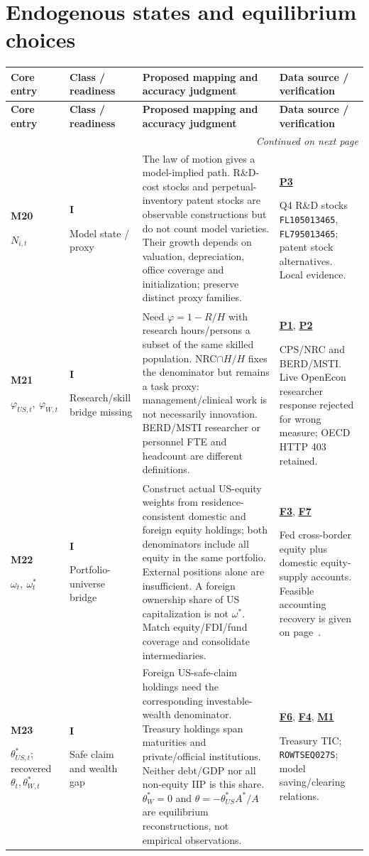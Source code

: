 \documentclass[10pt,a4paper,landscape]{article}
\makeatletter
\newcommand{\code}[1]{{\footnotesize\texttt{#1}}}
\newenvironment{measuretable}{%
\fontsize{9.4}{10.8}\selectfont\setlength{\parskip}{1pt}
\begin{longtable}{@{}P{\dimexpr .14\textwidth-4.2pt\relax}P{\dimexpr .135\textwidth-4.05pt\relax}P{\dimexpr .455\textwidth-13.65pt\relax}P{\dimexpr .27\textwidth-8.1pt\relax}@{}}
\toprule\rowcolor{tablehead}\textbf{Core entry} & \textbf{Class / readiness} & \textbf{Proposed mapping and accuracy judgment} & \textbf{Data source / verification}\\\midrule
\endfirsthead
\toprule\rowcolor{tablehead}\textbf{Core entry} & \textbf{Class / readiness} & \textbf{Proposed mapping and accuracy judgment} & \textbf{Data source / verification}\\\midrule
\endhead\midrule\multicolumn{4}{r}{\footnotesize\itshape Continued on next page}\\\endfoot
\bottomrule\endlastfoot
}{\end{longtable}}
\makeatother
\begin{document}
\section{Endogenous states and equilibrium choices}

\begin{measuretable}
\textbf{M20}\par $N_{i,t}$ & \textbf{I}\par Model state / proxy & The law of motion gives a model-implied path. R\&D-cost stocks and perpetual-inventory patent stocks are observable constructions but do not count model varieties. Their growth depends on valuation, depreciation, office coverage and initialization; preserve distinct proxy families. & \hyperlink{src-P3}{\textbf{P3}}\par Q4 R\&D stocks \code{FL105013465}, \code{FL795013465}; patent stock alternatives. Local evidence.\\[4pt]
\textbf{M21}\par $\varphi_{US,t},\ \varphi_{W,t}$ & \textbf{I}\par Research/skill bridge missing & Need $\varphi=1-R/H$ with research hours/persons a subset of the same skilled population. NRC$\cap H/H$ fixes the denominator but remains a task proxy: management/clinical work is not necessarily innovation. BERD/MSTI researcher or personnel FTE and headcount are different definitions. & \hyperlink{src-P1}{\textbf{P1}}, \hyperlink{src-P2}{\textbf{P2}}\par CPS/NRC and BERD/MSTI. Live OpenEcon researcher response rejected for wrong measure; OECD HTTP 403 retained.\\[4pt]
\textbf{M22}\par $\omega_t,\ \omega_t^*$ & \textbf{I}\par Portfolio-universe bridge & Construct actual US-equity weights from residence-consistent domestic and foreign equity holdings; both denominators include all equity in the same portfolio. External positions alone are insufficient. A foreign ownership share of US capitalization is not $\omega^*$. Match equity/FDI/fund coverage and consolidate intermediaries. & \hyperlink{src-F3}{\textbf{F3}}, \hyperlink{src-F7}{\textbf{F7}}\par Fed cross-border equity plus domestic equity-supply accounts. Feasible accounting recovery is given on page~\pageref{sec:bridges}.\\[4pt]
\textbf{M23}\par $\theta_{US,t}^*$; recovered $\theta_t,\theta_{W,t}^*$ & \textbf{I}\par Safe claim and wealth gap & Foreign US-safe-claim holdings need the corresponding investable-wealth denominator. Treasury holdings span maturities and private/official institutions. Neither debt/GDP nor all non-equity IIP is this share. $\theta_W^*=0$ and $\theta=-\theta_{US}^*A^*/A$ are equilibrium reconstructions, not empirical observations. & \hyperlink{src-F6}{\textbf{F6}}, \hyperlink{src-F4}{\textbf{F4}}, \hyperlink{src-M1}{\textbf{M1}}\par Treasury TIC; \code{ROWTSEQ027S}; model saving/clearing relations.\\[4pt]

\end{measuretable}
\end{document}
